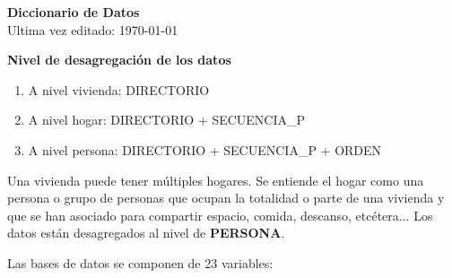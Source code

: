 \documentclass[12pt,a4paper]{article}
\begin{document}
\begin{center}
	\textbf{Diccionario de Datos} \\
	Ultima vez editado: \today
\end{center}
\vspace{10mm}

\textbf{Nivel de desagregación de los datos}
\begin{enumerate}
	\item A nivel vivienda: DIRECTORIO
	\item A nivel hogar: DIRECTORIO + SECUENCIA\_P
	\item A nivel persona: DIRECTORIO + SECUENCIA\_P + ORDEN
\end{enumerate}

Una vivienda puede tener múltiples hogares. Se entiende el hogar como una persona o grupo de personas que ocupan la totalidad o parte de una vivienda y que se han asociado para compartir espacio, comida, descanso, etcétera... Los datos están desagregados al nivel de \textbf{PERSONA}.

Las bases de datos se componen de 23 variables:
\end{document}
